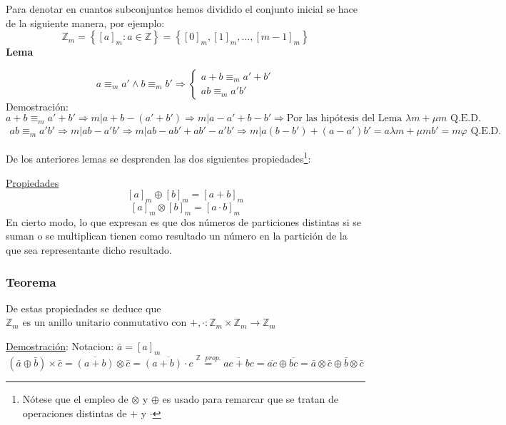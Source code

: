 \documentclass[10pt,a4paper,openright]{book}
\begin{document}
Para denotar en cuantos subconjuntos hemos dividido el conjunto inicial se hace de la siguiente manera, por ejemplo:
$$\mathbb Z_m=\left\lbrace [a]_m : a\in \mathbb Z\right\rbrace=\left\lbrace [0]_m, [1]_m, ..., [m-1]_m\right\rbrace$$
\textbf{Lema}\par
$$a\equiv_m a' \wedge b\equiv_m b' \Rightarrow
\begin{cases}
 a+b\equiv_m a'+b' \\
 ab\equiv_m a'b'
\end{cases}
$$
Demostración:
$$a+b\equiv_m a'+b'\Rightarrow m|a+b-(a'+b')\Rightarrow m|a-a'+b-b'\Rightarrow \mbox{Por las hipótesis del Lema } \lambda m + \mu m \mbox{ Q.E.D.}$$
\begin{gather*}
ab\equiv_m a'b'\Rightarrow m|ab-a'b'\Rightarrow m|ab-ab'+ab'-a'b'\Rightarrow m|a(b-b')+(a-a')b'=a\lambda m + \mu m b'=m\varphi \mbox{ Q.E.D.}
\end{gather*}

De los anteriores lemas se desprenden las dos siguientes propiedades\footnote{Nótese que el empleo de $\otimes$ y $\oplus$ es usado para remarcar que se tratan de operaciones distintas de $+$ y $\cdot$}:\par
\underline{Propiedades}
$$[a]_m \oplus [b]_m=[a+b]_m$$
$$[a]_m \otimes [b]_m=[a\cdot b]_m$$
En cierto modo, lo que expresan es que dos números de particiones distintas si se suman o se multiplican tienen como resultado un número en la partición de la que sea representante dicho resultado.

\subsubsection*{Teorema}
De estas propiedades se deduce que $\mathbb Z_m \mbox{ es un anillo  unitario conmutativo con }+,\cdot : \mathbb Z_m \times \mathbb Z_m \rightarrow \mathbb Z_m$\par
\underline{Demostración}: Notacion: $\bar{a}=[a]_m$
$$(\bar{a}\oplus \bar{b})\times\bar{c}=\overline{(a+b)}\otimes\bar{c}=\overline{(a+b)\cdot c}\stackrel{\mathbb Z\mbox{ }prop.}{=}\overline{ac+bc}=\overline{ac}\oplus\overline{bc}=\bar{a}\otimes\bar{c}\oplus\bar{b}\otimes\bar{c}$$
\end{document}
